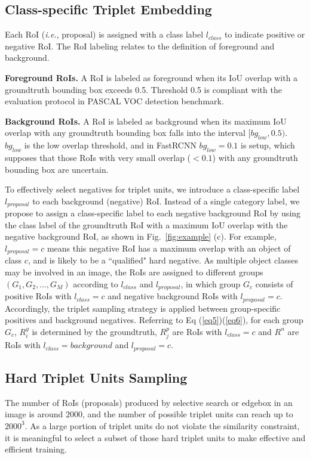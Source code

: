 \documentclass{article}
\begin{document}
{\subsection{Class-specific Triplet Embedding}
Each RoI (\textit{i.e.}, proposal) is assigned with a class label $l_{class}$ to indicate positive or negative RoI. The RoI labeling relates to the definition of foreground and background.

\textbf{Foreground RoIs.} A RoI is labeled as foreground when its IoU overlap with a groundtruth bounding box exceeds 0.5. Threshold 0.5 is compliant with the evaluation protocol in PASCAL VOC detection benchmark.

\textbf{Background RoIs.} A RoI is labeled as background when its maximum IoU overlap with any groundtruth bounding box falls into the interval $[bg_{low},0.5)$. $bg_{low}$ is the low overlap threshold, and in FastRCNN $bg_{low} = 0.1$ is setup, which supposes that those RoIs with very small overlap ($<0.1$) with any groundtruth bounding box are uncertain.

To effectively select negatives for triplet units, we introduce a class-specific label $l_{proposal}$ to each background (negative) RoI. Instead of a single category label, we propose to assign a class-specific label to each negative background RoI by using the class label of the groundtruth RoI with a maximum IoU overlap with the negative background RoI, as shown in Fig.~\ref{fig:example} (c). For example, $l_{proposal} = c$ means this negative RoI has a maximum overlap with an object of class $c$, and is likely to be a ``qualified" hard negative. As multiple object classes may be involved in an image, the RoIs are assigned to different groups $(G_1,G_2,...,G_M)$ according to $l_{class}$ and $l_{proposal}$, in which group $G_c$ consists of positive RoIs with $l_{class}=c$ and negative background RoIs with $l_{proposal}=c$. Accordingly, the triplet sampling strategy is applied between group-specific positives and background negatives. Referring to Eq (\ref{eq5})(\ref{eq6}), for each group $G_c$, $R_i^g$ is determined by the groundtruth, $R_j^p$ are RoIs with $l_{class}=c$ and $R^n$ are RoIs with $l_{class}=background$ and $l_{proposal}=c$.

\subsection{Hard Triplet Units Sampling}
The number of RoIs (proposals) produced by selective search \cite{selectivesearch} or edgebox \cite{edgebox} in an image is around $2000$, and the number of possible triplet units can reach up to $2000^3$. As a large portion of triplet units do not violate the similarity constraint, it is meaningful to select a subset of those hard triplet units to make effective and efficient training.

}
\end{document}
